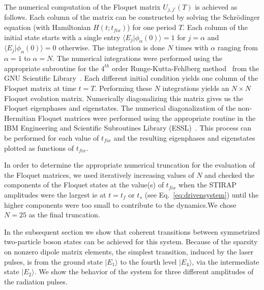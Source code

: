 The numerical computation of the Floquet matrix $U_{j,j'}(T)$  is achieved as follows. Each column of the matrix can be constructed by solving the Schr\"odinger equation (with Hamiltonian $H(t;t_{fix})$)  for one period $T$.  Each column of the initial state starts with a single entry ${\langle}E_j|\phi_{\alpha}(0)\rangle=1$  for $j=\alpha$ and ${\langle}E_j|\phi_{\alpha}(0)\rangle=0$ otherwise.  The integration is done $N$ times with $\alpha$ ranging from $\alpha=1$ to $\alpha=N$.  The numerical integrations were performed using the appropriate subroutine for the $4^{th}$ order Runge-Kutta-Fehlberg method~\cite{rkutta:pd} from the GNU Scientific Library~\cite{galassi:gsl}. Each different initial condition yields one column of the Floquet matrix at time $t=T$. Performing these $N$ integrations yields an $N{\times}N$ Floquet evolution matrix. Numerically diagonalizing this matrix gives us the Floquet eigenphases and eigenstates. The numerical diagonalization of the non-Hermitian Floquet matrices were performed using the appropriate routine in the IBM{\texttrademark}  Engineering and Scientific Subroutines Library (ESSL)~\cite{ibm:essl}. This process can be performed for each value of $t_{fix}$ and the resulting eigenphases and eigenstates plotted as functions of $t_{fix}$.

In order to determine the appropriate numerical truncation for the evaluation of the Floquet matrices, we used iteratively increasing values of $N$ and checked the components of the Floquet states at the value(s) of $t_{fix}$ when  the STIRAP amplitudes were the largest ie at $t=t_f$ or $t_s$ (see Eq.~\eqref{eq:drivensystem}) until the higher components were too small to contribute to the dynamics.We chose $N=25$ as the final truncation.

In the subsequent section we show that coherent  transitions between symmetrized two-particle boson states can be achieved for this  system. Because of the sparsity on nonzero dipole matrix elements, the simplest transition, induced by the laser pulses,  is from the ground state $|E_1{\rangle}$ to the fourth level $|E_4{\rangle}$, via the intermediate state $|E_2{\rangle}$.  We show the behavior of the system for three different amplitudes of the radiation pulses. 

%
%
